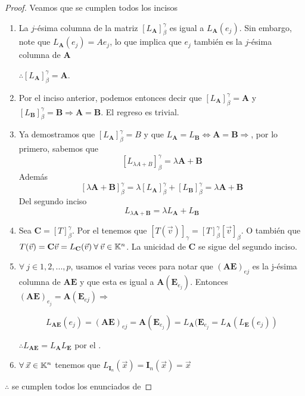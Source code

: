 \begin{proof}
Veamos que se cumplen todos los incisos

\begin{enumerate}
    \item La $j$-ésima columna de la matriz $[L_{\textbf{A}}]_{\beta}^{\gamma}$ es igual a $L_{\textbf{A}}(e_j)$. Sin embargo, note  que $L_{\textbf{A}}(e_j)=Ae_j$, lo que implica que $e_j$ también es la $j$-ésima columna de $\textbf{A}$
    
    $\therefore [L_{\textbf{A}}]_{\beta}^{\gamma}=\textbf{A}$.
    \item Por el inciso anterior, podemos entonces decir que $[L_{\textbf{A}}]_{\beta}^{\gamma}=\textbf{A}$ y $[L_{\textbf{B}}]_{\beta}^{\gamma}=\textbf{B} \Rightarrow \textbf{A}=\textbf{B}$. El regreso es trivial.
    \item Ya demostramos que ${[L_{\textbf{A}}]}_{\beta}^{\gamma} = B$ y que $L_{\textbf{A}} = L_{\textbf{B}} \iff \textbf{A} = \textbf{B} \Rightarrow$, por lo primero, sabemos que
    $$ {[L_{\lambda A + B}]}_{\beta}^{\gamma} = \lambda \textbf{A} + \textbf{B}$$
    Además
    $${[\lambda \textbf{A} + \textbf{B}]}_{\beta}^{\gamma} =  \lambda {[L_{\textbf{A}}]}_{\beta}^{\gamma} +  {[L_{\textbf{B}}]}_{\beta}^{\gamma} = \lambda \textbf{A} + \textbf{B}$$
    Del segundo inciso
    $$L_{\lambda \textbf{A} + \textbf{B}} = \lambda L_{\textbf{A}} + L_{\textbf{B}}$$
    \item Sea $\textbf{C}=[T]_{\beta}^{\gamma}$. Por el   tenemos que $[T(\vec{v})]_{\gamma}=[T]_{\beta}^{\gamma}[\vec{v}]_{\beta}$. O también que $T(\vec{v})=\textbf{C}\vec{v}=L_{\textbf{C}}(\vec{v}) \: \forall \: \vec{v} \in \mathbb{K}^n$. La unicidad de $\textbf{C}$ se sigue del segundo inciso.
    \item $\forall \: j \in {1,2,...,p}$, usamos el   varias veces para notar que $(\textbf{AE})_{ej}$ es la j-ésima columna de $\textbf{AE}$ y que esta es igual a $\textbf{A}({\textbf{E}}_{e_j})$. Entonces $(\textbf{AE})_{e_j}=\textbf{A}({\textbf{E}}_{ej}) \Rightarrow$ 
    
    $$L_{\textbf{AE}}(e_j)=(\textbf{AE})_{ej}=\textbf{A}({\textbf{E}}_{e_j})=L_{\textbf{A}}({\textbf{E}}_{e_j}=L_{\textbf{A}}(L_{\textbf{E}}(e_j))$$ 
    
     $\therefore L_{\textbf{AE}}=L_{\textbf{A}}L_{\textbf{E}}$ por el  . 
     \item $\forall \: \vec{x} \in \mathbb{K}^n$ tenemos que $L_{\textbf{I}_n}(\vec{x})={\textbf{I}}_{n}(\vec{x})=\vec{x}$
\end{enumerate}
    $\therefore$ se cumplen todos los enunciados de 
\end{proof}



